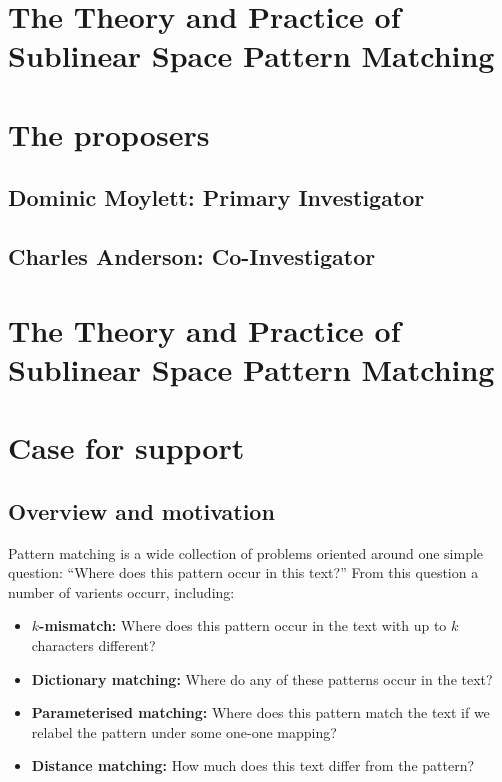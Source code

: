 \documentclass[a4paper,11pt]{article}
\begin{document}
    \section*{The Theory and Practice of Sublinear Space Pattern Matching}

    \section{The proposers}

    \subsection{Dominic Moylett: Primary Investigator}

    \subsection{Charles Anderson: Co-Investigator}

    \newpage

    \section*{The Theory and Practice of Sublinear Space Pattern Matching}
    \section{Case for support}

    \subsection{Overview and motivation}

    Pattern matching is a wide collection of problems oriented around one simple question: ``Where does this pattern occur in this text?'' From this question a number of varients occurr, including:

    \begin{itemize}
        \item \textbf{$k$-mismatch:} Where does this pattern occur in the text with up to $k$ characters different?
        \item \textbf{Dictionary matching:} Where do any of these patterns occur in the text?
        \item \textbf{Parameterised matching:} Where does this pattern match the text if we relabel the pattern under some one-one mapping?
        \item \textbf{Distance matching:} How much does this text differ from the pattern?
    \end{itemize}
\end{document}
